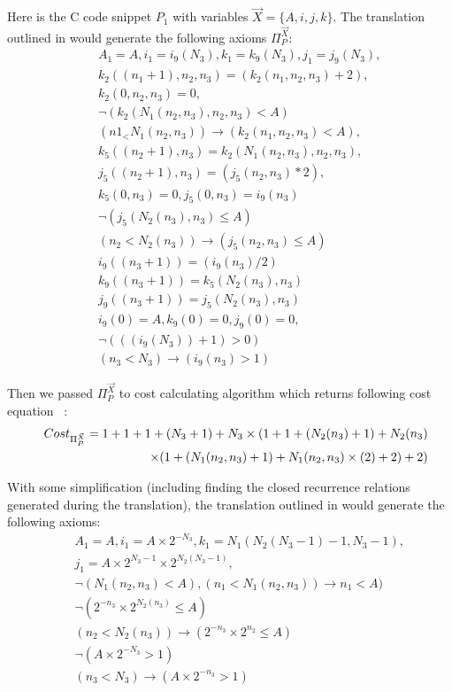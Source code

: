 \documentclass[12pt]{extarticle}
\theoremstyle{definition}
\begin{document}
Here is the C code snippet $P_1$ with variables $\vec{X}=\{A,i,j,k\}$. The translation outlined in \cite{Lin20161} would generate the following axioms $\Pi_{P}^{\vec{X}}$:
\begin{eqnarray*}
	&& A_1 = A, i_1 = i_9(N_3), k_1 = k_9(N_3), j_1 = j_9(N_3),\\ 
	&& k_2((n_1+1),n_2,n_3) = (k_2(n_1,n_2,n_3)+2),\\
	&& k_2(0,n_2,n_3) = 0,\\
	&& \neg (k_2(N_1(n_2,n_3),n_2,n_3)<A)\\
	&& (n1_<N_1(n_2,n_3)) \rightarrow (k_2(n_1,n_2,n_3)<A),\\
	&& k_5((n_2+1),n_3) = k_2(N_1(n_2,n_3),n_2,n_3),\\
	&& j_5((n_2+1),n_3) = (j_5(n_2,n_3)*2),\\
	&& k_5(0,n_3) = 0, j_5(0,n_3) = i_9(n_3)\\
	&& \neg (j_5(N_2(n_3),n_3)\leq A)\\
	&& (n_2<N_2(n_3)) \rightarrow (j_5(n_2,n_3)\leq A)\\
	&& i_9((n_3+1)) = (i_9(n_3)/2)\\
	&& k_9((n_3+1)) = k_5(N_2(n_3),n_3)\\
	&& j_9((n_3+1)) = j_5(N_2(n_3),n_3)\\
	&& i_9(0) = A, k_9(0) = 0, j_9(0) = 0,\\
	&& \neg (((i_9(N_3))+1)>0)\\
	&&(n_3<N_3) \rightarrow (i_9(n_3)>1)
\end{eqnarray*}

Then we passed $\Pi_{P}^{\vec{X}}$ to cost calculating algorithm which returns following cost equation  :
\begin{eqnarray*}
&&Cost_{\Pi_{P}^{\vec{X}}}=1+1+1+(N_3+1)+N_3\times(1+1+(N_2(n_3)+1)+N_2(n_3)\\
&&\hspace*{5em}\times(1+(N_1(n_2,n_3)+1)+N_1(n_2,n_3)\times(2)+2)+2)
\end{eqnarray*}


With some simplification (including finding the closed recurrence relations generated during the translation), the translation outlined in \cite{Lin20161} would generate the following axioms:
\begin{eqnarray*}
	&& A_1 = A, i_1 = A\times  2^{-N_3} , k_1 = N_1(N_2(N_3-1)-1,N_3-1), \\
	&&j_1 = A\times 2^{N_3-1}\times 2^{N_2(N_3-1)},\\ 
	&&\neg (N_1(n_2,n_3)<A),(n_1<N_1(n_2,n_3)) \rightarrow n_1<A)\\
	&&\neg (2^{-n_3}\times 2^{N_2(n_3)} \leq A)\\
	&&(n_2<N_2(n_3)) \rightarrow (2^{-n_3}\times 2^{n_2}\leq A)\\
	&&\neg (A\times 2^{-N_3}>1)\\
	&&(n_3<N_3) \rightarrow (A\times 2^{-n_3}>1)
\end{eqnarray*}
\end{document}
